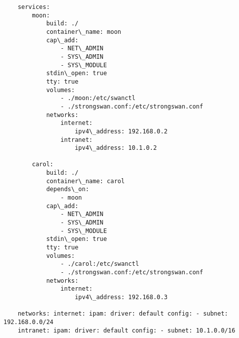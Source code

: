 \newpage

\begin{lstlisting}
    services: 
        moon: 
            build: ./ 
            container\_name: moon 
            cap\_add: 
                - NET\_ADMIN 
                - SYS\_ADMIN 
                - SYS\_MODULE 
            stdin\_open: true 
            tty: true 
            volumes: 
                - ./moon:/etc/swanctl 
                - ./strongswan.conf:/etc/strongswan.conf 
            networks: 
                internet:
                    ipv4\_address: 192.168.0.2 
                intranet: 
                    ipv4\_address: 10.1.0.2 
        
        carol: 
            build: ./ 
            container\_name: carol 
            depends\_on: 
                - moon 
            cap\_add: 
                - NET\_ADMIN 
                - SYS\_ADMIN 
                - SYS\_MODULE 
            stdin\_open: true 
            tty: true 
            volumes: 
                - ./carol:/etc/swanctl 
                - ./strongswan.conf:/etc/strongswan.conf 
            networks: 
                internet:
                    ipv4\_address: 192.168.0.3
    
    networks: internet: ipam: driver: default config: - subnet: 192.168.0.0/24
    intranet: ipam: driver: default config: - subnet: 10.1.0.0/16
\end{lstlisting}